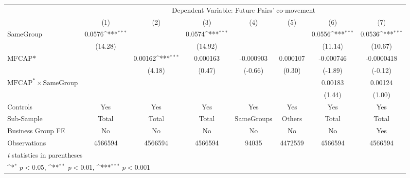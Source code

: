 {
\def\sym#1{\ifmmode^{#1}\else\(^{#1}\)\fi}
\begin{tabular}{l*{7}{c}}
\hline\hline
                &\multicolumn{7}{c}{Dependent Variable: Future Pairs' co-movement}                                                                   \\\cmidrule(lr){2-8}
                &\multicolumn{1}{c}{(1)}         &\multicolumn{1}{c}{(2)}         &\multicolumn{1}{c}{(3)}         &\multicolumn{1}{c}{(4)}         &\multicolumn{1}{c}{(5)}         &\multicolumn{1}{c}{(6)}         &\multicolumn{1}{c}{(7)}         \\
\hline
SameGroup       &   0.0576\sym{***}&                  &   0.0574\sym{***}&                  &                  &   0.0556\sym{***}&   0.0536\sym{***}\\
                &  (14.28)         &                  &  (14.92)         &                  &                  &  (11.14)         &  (10.67)         \\
[1em]
$ \text{MFCAP*} $&                  &  0.00162\sym{***}& 0.000163         &-0.000903         & 0.000107         &-0.000746         &-0.0000418         \\
                &                  &   (4.18)         &   (0.47)         &  (-0.66)         &   (0.30)         &  (-1.89)         &  (-0.12)         \\
[1em]
 $ \text{MFCAP}^* \times {\text{SameGroup} }  $ &                  &                  &                  &                  &                  &  0.00183         &  0.00124         \\
                &                  &                  &                  &                  &                  &   (1.44)         &   (1.00)         \\
\hline
Controls        &      Yes         &      Yes         &      Yes         &      Yes         &      Yes         &      Yes         &      Yes         \\
Sub-Sample      &    Total         &    Total         &    Total         &SameGroups         &   Others         &    Total         &    Total         \\
Business Group FE&       No         &       No         &       No         &       No         &       No         &       No         &      Yes         \\
Observations    &  4566594         &  4566594         &  4566594         &    94035         &  4472559         &  4566594         &  4566594         \\
\hline\hline
\multicolumn{8}{l}{\footnotesize \textit{t} statistics in parentheses}\\
\multicolumn{8}{l}{\footnotesize \sym{*} \(p<0.05\), \sym{**} \(p<0.01\), \sym{***} \(p<0.001\)}\\
\end{tabular}
}
